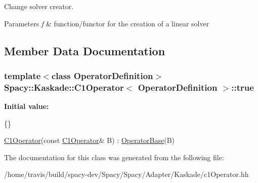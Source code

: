 Change solver creator. 


\begin{DoxyParams}{Parameters}
{\em f} & function/functor for the creation of a linear solver \\
\hline
\end{DoxyParams}


\subsection{Member Data Documentation}
\hypertarget{classSpacy_1_1Kaskade_1_1C1Operator_a994c1b2ee4242224d2393fe2ce00caa3}{
\subsubsection[{true}]{\setlength{\rightskip}{0pt plus 5cm}template$<$class Operator\-Definition$>$ {\bf Spacy\-::\-Kaskade\-::\-C1\-Operator}$<$ Operator\-Definition $>$\-::true}}\label{classSpacy_1_1Kaskade_1_1C1Operator_a994c1b2ee4242224d2393fe2ce00caa3}
{\bfseries Initial value\-:}
\begin{DoxyCode}
\{\}

            
            \hyperlink{classSpacy_1_1Kaskade_1_1C1Operator_aa31e9f54fcbb4eb6c40c1cd467d25836}{C1Operator}(\textcolor{keyword}{const} \hyperlink{classSpacy_1_1Kaskade_1_1C1Operator_aa31e9f54fcbb4eb6c40c1cd467d25836}{C1Operator}& B)
                : \hyperlink{classSpacy_1_1OperatorBase_a0e61c53f3dc6088609701c022410841c}{OperatorBase}(B)
\end{DoxyCode}


The documentation for this class was generated from the following file\-:\begin{DoxyCompactItemize}
\item 
/home/travis/build/spacy-\/dev/\-Spacy/\-Spacy/\-Adapter/\-Kaskade/c1\-Operator.\-hh\end{DoxyCompactItemize}
